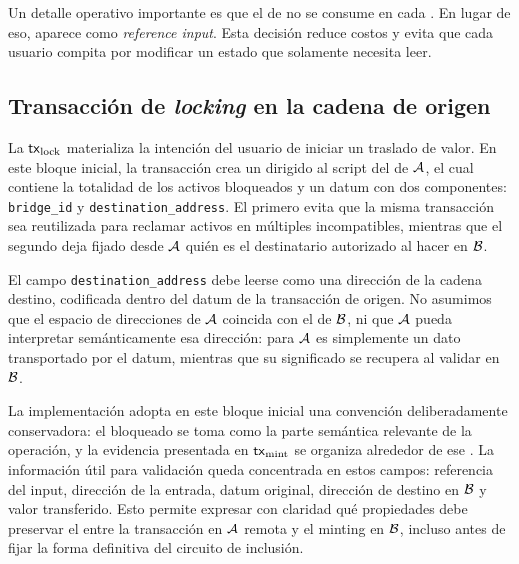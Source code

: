 Un detalle operativo importante es que el \UTxO de \StakeDistribution no se consume en cada \MintTx. En lugar de eso, aparece como \textit{reference input}. Esta decisión reduce costos y evita que cada usuario compita por modificar un estado que solamente necesita leer.

\subsection{Transacción de \textit{locking} en la cadena de origen}
\label{subsec:validadores-y-flujo-transaccional-transaccion-de-locking-en-la-cadena-de-origen}

La $\mathsf{tx}_{\mathrm{lock}}$ materializa la intención del usuario de iniciar un traslado de valor. En este bloque inicial, la transacción crea un \UTxO dirigido al script del \UnlockingValidator de $\mathcal{A}$, el cual contiene la totalidad de los activos bloqueados y un datum con dos componentes: \texttt{bridge\_id} y \texttt{destination\_address}. El primero evita que la misma transacción sea reutilizada para reclamar activos en múltiples \Bridges incompatibles, mientras que el segundo deja fijado desde $\mathcal{A}$ quién es el destinatario autorizado al hacer \MintTx en $\mathcal{B}$.

El campo \texttt{destination\_address} debe leerse como una dirección de la cadena destino, codificada dentro del datum de la transacción de origen. No asumimos que el espacio de direcciones de $\mathcal{A}$ coincida con el de $\mathcal{B}$, ni que $\mathcal{A}$ pueda interpretar semánticamente esa dirección: para $\mathcal{A}$ es simplemente un dato transportado por el datum, mientras que su significado se recupera al validar \MintTx en $\mathcal{B}$.

La implementación adopta en este bloque inicial una convención deliberadamente conservadora: el \UTxO bloqueado se toma como la parte semántica relevante de la operación, y la evidencia presentada en $\mathsf{tx}_{\mathrm{mint}}$ se organiza alrededor de ese \UTxO. La información útil para validación queda concentrada en estos campos: referencia del input, dirección de la entrada, datum original, dirección de destino en $\mathcal{B}$ y valor transferido. Esto permite expresar con claridad qué propiedades debe preservar el \zkBridge entre la transacción en $\mathcal{A}$ remota y el minting en $\mathcal{B}$, incluso antes de fijar la forma definitiva del circuito de inclusión.

